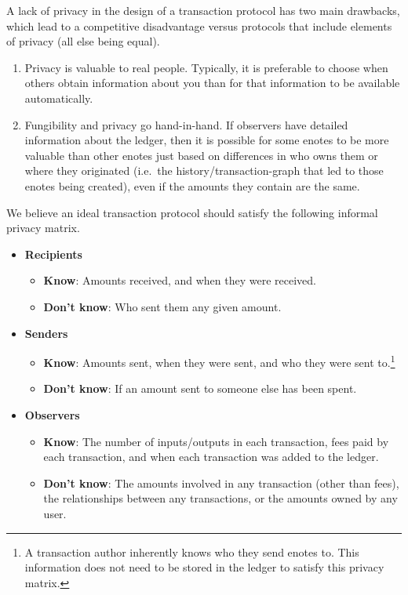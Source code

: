 A lack of privacy in the design of a transaction protocol has two main drawbacks, which lead to a competitive disadvantage versus protocols that include elements of privacy (all else being equal).

\begin{enumerate}
    \item Privacy is valuable to real people. Typically, it is preferable to choose when others obtain information about you than for that information to be available automatically.
    \item Fungibility and privacy go hand-in-hand. If observers have detailed information about the ledger, then it is possible for some enotes to be more valuable than other enotes just based on differences in who owns them or where they originated (i.e.\ the history/transaction-graph that led to those enotes being created), even if the amounts they contain are the same.
\end{enumerate}

We believe an ideal transaction protocol should satisfy the following informal privacy matrix.

\begin{itemize}
    \item \textbf{Recipients}
    \begin{itemize}
        \item \textbf{Know}: Amounts received, and when they were received.
        \item \textbf{Don't know}: Who sent them any given amount.
    \end{itemize}
    \item \textbf{Senders}
    \begin{itemize}
        \item \textbf{Know}: Amounts sent, when they were sent, and who they were sent to.\footnote{A transaction author inherently knows who they send enotes to. This information does not need to be stored in the ledger to satisfy this privacy matrix.}
        \item \textbf{Don't know}: If an amount sent to someone else has been spent.
    \end{itemize}
    \item \textbf{Observers}
    \begin{itemize}
        \item \textbf{Know}: The number of inputs/outputs in each transaction, fees paid by each transaction, and when each transaction was added to the ledger.
        \item \textbf{Don't know}: The amounts involved in any transaction (other than fees), the relationships between any transactions, or the amounts owned by any user.
    \end{itemize}
\end{itemize}

